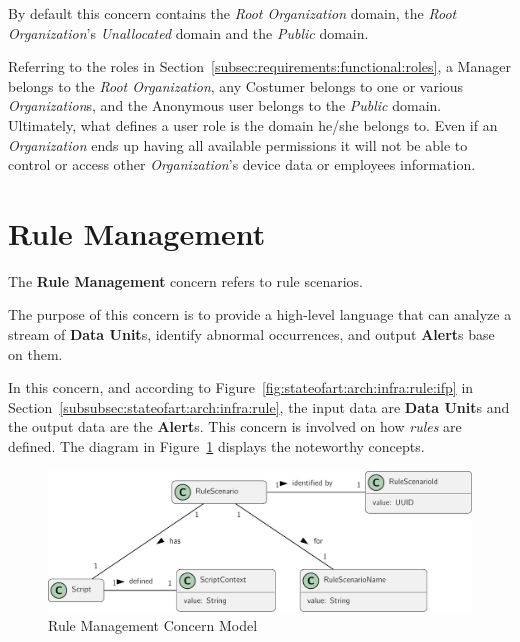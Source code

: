 By default this concern contains the \textit{Root Organization} domain, the \textit{Root Organization}'s  \textit{Unallocated} domain and the \textit{Public} domain.

Referring to the roles in Section~\ref{subsec:requirements:functional:roles}, a Manager belongs to the \textit{Root Organization}, any Costumer belongs to one or various \textit{Organization}s, and the Anonymous user belongs to the \textit{Public} domain.
Ultimately, what defines a user role is the domain he/she belongs to. Even if an \textit{Organization} ends up having all available permissions it will not be able to control or access other \textit{Organization}'s device data or employees information.

\section{Rule Management}
\label{subsubsec:design:domain:bounded_contexts:rule}

The \textbf{Rule Management} concern refers to rule scenarios.

The purpose of this concern is to provide a high-level language that can analyze a stream of \textbf{Data Unit}s, identify abnormal occurrences, and output \textbf{Alert}s base on them.

In this concern, and according to Figure~\ref{fig:stateofart:arch:infra:rule:ifp} in Section~\ref{subsubsec:stateofart:arch:infra:rule}, the input data are \textbf{Data Unit}s and the output data are the \textbf{Alert}s. This concern is involved on how \textit{rules} are defined. The diagram in Figure~\ref{fig:design:domain:bounded_contexts:rule:diagram} displays the noteworthy concepts.

\begin{figure}[H]
   \centering
   \includegraphics[page=1,width=\columnwidth]{assets/diagrams/design/domain/rule-management-model.pdf}
  \caption[Rule Management Concern Model]{Rule Management Concern Model}
  \label{fig:design:domain:bounded_contexts:rule:diagram}
\end{figure}
